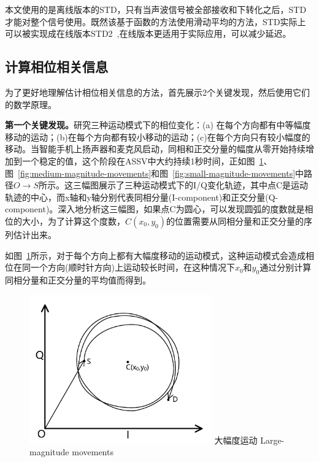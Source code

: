 本文使用的是离线版本的STD，只有当声波信号被全部接收和下转化之后，STD才能对整个信号使用。既然该基于函数的方法使用滑动平均的方法，STD实际上可以被实现成在线版本STD2~\cite{std2},在线版本更适用于实际应用，可以减少延迟。

\subsection{计算相位相关信息}
为了更好地理解估计相位相关信息的方法，首先展示2个关键发现，然后使用它们的数学原理。

\textbf{第一个关键发现。}研究三种运动模式下的相位变化：(a) 在每个方向都有中等幅度移动的运动；(b)在每个方向都有较小移动的运动；(c)在每个方向只有较小幅度的移动。当智能手机上扬声器和麦克风启动，同相和正交分量的幅度从零开始持续增加到一个稳定的值，这个阶段在ASSV中大约持续1秒时间，正如图~\ref{fig:large-magnitude-movements}、图~\ref{fig:medium-magnitude-movements}和图~\ref{fig:small-magnitude-movements}中路径$O\rightarrow S$所示。这三幅图展示了三种运动模式下的I/Q变化轨迹，其中点C是运动轨迹的中心，而x轴和y轴分别代表同相分量(I-component)和正交分量(Q-component)。深入地分析这三幅图，如果点C为圆心，可以发现圆弧的度数就是相位的大小，为了计算这个度数，$C(x_{0},y_{0})$的位置需要从同相分量和正交分量的序列估计出来。

如图~\ref{fig:large-magnitude-movements}所示，对于每个方向上都有大幅度移动的运动模式，这种运动模式会造成相位在同一个方向(顺时针方向)上运动较长时间，在这种情况下$x_0$和$y_0$通过分别计算同相分量和正交分量的平均值而得到。
\begin{figure}[!htp]
  \centering
  \includegraphics[width=0.7\textwidth]{figure/large-magnitude-movement.pdf}
  \bicaption
    {大幅度运动}
    {Large-magnitude movements}
  \label{fig:large-magnitude-movements}
\end{figure}

